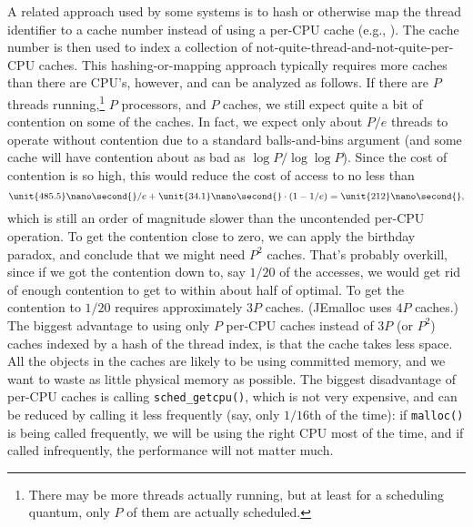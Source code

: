 \documentclass{sigplanconf}
\newcommand{\code}[1]{\texttt{#1}}
\newcommand{\ns}[1]{\unit{#1}\nano\second{}}
\begin{document}
A related approach used by some systems is to hash or otherwise map
the thread identifier to a cache number instead of using a per-CPU
cache (e.g., \cite{LarsonKr98, Evans06}).  The cache number is then
used to index a collection of not-quite-thread-and-not-quite-per-CPU
caches.  This hashing-or-mapping approach typically requires more
caches than there are CPU's, however, and can be analyzed as follows.
If there are $P$ threads running,\footnote{There may be more threads
  actually running, but at least for a scheduling quantum, only $P$ of
  them are actually scheduled.} $P$ processors, and $P$ caches, we
still expect quite a bit of contention on some of the caches.  In
fact, we expect only about $P/e$ threads to operate without contention
due to a standard balls-and-bins argument (and some cache will have
contention about as bad as $\log P/\log\log P$).  Since the cost of
contention is so high, this would reduce the cost of access to no less
than
\[ \ns{485.5}/e + \ns{34.1}\cdot(1-1/e) = \ns{212},\]
which is still an order of magnitude slower than the uncontended
per-CPU operation.  To get the contention close to zero, we can apply
the birthday paradox, and conclude that we might need $P^2$ caches.
That's probably overkill, since if we got the contention down to, say
$1/20$ of the accesses, we would get rid of enough contention to get
to within about half of optimal.  To get the contention to $1/20$
requires approximately $3P$ caches.  (JEmalloc uses $4P$ caches.)  The
biggest advantage to using only $P$ per-CPU caches instead of $3P$ (or
$P^2$) caches indexed by a hash of the thread index, is that the cache
takes less space.  All the objects in the caches are likely to be
using committed memory, and we want to waste as little physical memory
as possible.  The biggest disadvantage of per-CPU caches is calling
\code{sched_getcpu()}, which is not very expensive, and can be reduced
by calling it less frequently (say, only $1/16$th of the time): if
\texttt{malloc()} is being called frequently, we will be using the
right CPU most of the time, and if called infrequently, the
performance will not matter much.
\end{document}
